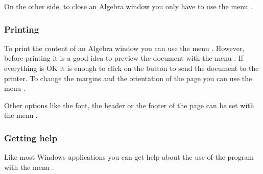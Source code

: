 On the other side, to close an Algebra window you only have to use the menu 
.


\subsubsection*{Printing}
To print the content of an Algebra window you can use the menu .
However, before printing it is a good idea to preview the document with the menu 
. 
If everything is OK it is enough to click on the button  to send the document to the printer. 
To change the margins and the orientation of the page you can use the menu .

Other options like the font, the header or the footer of the page can be set with the menu .


\subsubsection*{Getting help}
Like most Windows applications you can get help about the use of the program with the menu .
